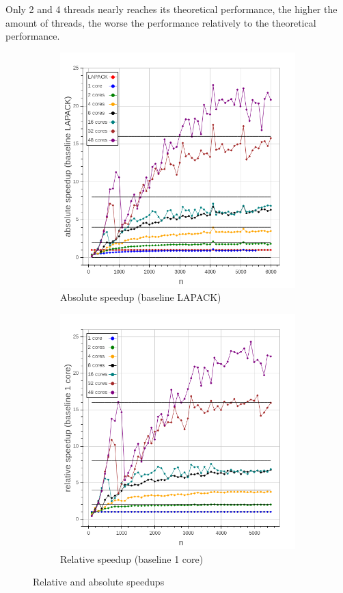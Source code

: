 \documentclass[a4paper,final,ngerman,english]{article}
\begin{document}
Only 2 and 4 threads nearly reaches its theoretical performance, the higher the amount of threads,
the worse the performance relatively to the theoretical performance.

\begin{figure}[h!]
	\centering
	\begin{subfigure}{0.4\textwidth}
	\includegraphics[width=\textwidth]{abs_speedup}
	\caption{Absolute speedup (baseline LAPACK)}
\label{fig:rel}
	\end{subfigure}
	\begin{subfigure}{0.4\textwidth}
	\includegraphics[width=\textwidth]{rel_speedup}
	\caption{Relative speedup (baseline 1 core)}
\label{fig:abs}
	\end{subfigure}
	\caption{Relative and absolute speedups}
\end{figure}
\end{document}

